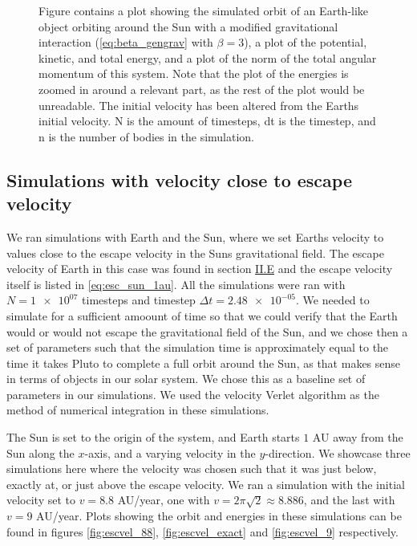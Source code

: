 \documentclass[reprint,english,notitlepage]{revtex4-1}  %
\begin{document}
\begin{figure}[H]
\caption{Figure contains a plot showing the simulated orbit of an Earth-like object orbiting around the Sun with a modified gravitational interaction (\eqref{eq:beta_gengrav} with $\beta = 3$), a plot of the potential, kinetic, and total energy, and a plot of the norm of the total angular momentum of this system. Note that the plot of the energies is zoomed in around a relevant part, as the rest of the plot would be unreadable. The initial velocity has been altered from the Earths initial velocity. N is the amount of timesteps, dt is the timestep, and n is the number of bodies in the simulation.}
\label{fig:beta3_peturbed}
\end{figure}


\subsection{Simulations with velocity close to escape velocity} \label{sec:IV:d}

We ran simulations with Earth and the Sun, where we set Earths velocity to values close to the escape velocity in the Suns gravitational field. The escape velocity of Earth in this case was found in section \hyperref[sec:II:e]{II.E} and the escape velocity itself is listed in \eqref{eq:esc_sun_1au}. All the simulations were ran with $N = \num{1e+07}$ timesteps and timestep $\Delta t = \num{2.48e-05}$. We needed to simulate for a sufficient amoount of time so that we could verify that the Earth would or would not escape the gravitational field of the Sun, and we chose then a set of parameters such that the simulation time is approximately equal to the time it takes Pluto to complete a full orbit around the Sun, as that makes sense in terms of objects in our solar system. We chose this as a baseline set of parameters in our simulations. We used the velocity Verlet algorithm as the method of numerical integration in these simulations.

The Sun is set to the origin of the system, and Earth starts $1$ AU away from the Sun along the $x$-axis, and a varying velocity in the $y$-direction. We showcase three simulations here where the velocity was chosen such that it was just below, exactly at, or just above the escape velocity. We ran a simulation with the initial velocity set to $v = 8.8$ AU/year, one with $v = 2\pi \sqrt{2} \approx 8.886$, and the last with $v = 9$ AU/year. Plots showing the orbit and energies in these simulations can be found in figures \ref{fig:escvel_88}, \ref{fig:escvel_exact} and \ref{fig:escvel_9} respectively.
\end{document}
